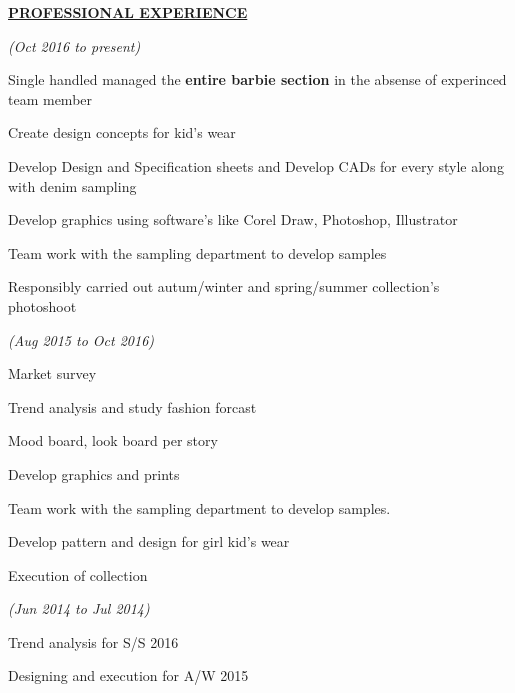 \documentclass[a4paper]{deedy-resume} %
\begin{document}
{\uppercase\uline{\textbf{\large{Professional Experience}}\hfill}}
\microspace
\sectionspace


\hfill {\textit{\small(Oct 2016 to present)}}\\

\begin{tightitemize}
\item Single handled managed the \textbf{entire barbie section} in the absense of experinced team member
\item Create design concepts for kid's wear
\item Develop Design and Specification sheets and Develop CADs for every style along with denim sampling
\item Develop graphics using software's like Corel Draw, Photoshop, Illustrator
\item Team work with the sampling department to develop samples
\item Responsibly carried out autum/winter and spring/summer collection's photoshoot 
\end{tightitemize}
\microspace
\sectionspace


\hfill {\textit{\small(Aug 2015 to Oct 2016)}}\\

\begin{tightitemize}
\item Market survey
\item Trend analysis and study fashion forcast
\item Mood board, look board per story 
\item Develop graphics and prints
\item Team work with the sampling department to develop samples. 
\item Develop pattern and design for girl kid's wear
\item Execution of collection 
\end{tightitemize}
\microspace
\sectionspace

\hfill {\textit{\small(Jun 2014 to Jul 2014)}}\


\begin{tightitemize}
\item Trend analysis for S/S 2016
\item Designing and execution for A/W 2015
\end{tightitemize}
\end{document}
